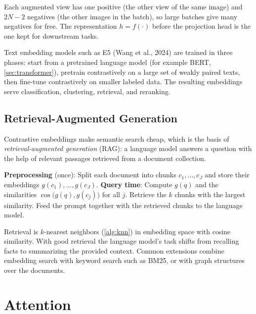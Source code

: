 Each augmented view has one positive (the other view of the same image) and $2N-2$ negatives (the other images in the batch), so large batches give many negatives for free. The representation $h=f(\cdot)$ before the projection head is the one kept for downstream tasks.

Text embedding models such as E5 (Wang et al., 2024) are trained in three phases: start from a pretrained language model (for example BERT, \cref{sec:transformer}), pretrain contrastively on a large set of weakly paired texts, then fine-tune contrastively on smaller labeled data. The resulting embeddings serve classification, clustering, retrieval, and reranking.

\subsection{Retrieval-Augmented Generation}

Contrastive embeddings make semantic search cheap, which is the basis of \emph{retrieval-augmented generation} (RAG): a language model answers a question with the help of relevant passages retrieved from a document collection.

\begin{algorithm}[H]
\caption{Retrieval-Augmented Generation}\label{alg:rag}
\begin{algorithmic}[1]
\Statex \textbf{Preprocessing} (once):
\State Split each document into chunks $c_1,\dots,c_J$ and store their embeddings $g(c_1),\dots,g(c_J)$.
\Statex \textbf{Query time}:
\State Compute $g(q)$ and the similarities $\cos\big(g(q),g(c_j)\big)$ for all $j$.
\State Retrieve the $k$ chunks with the largest similarity.
\State Feed the prompt together with the retrieved chunks to the language model.
\end{algorithmic}
\end{algorithm}

Retrieval is $k$-nearest neighbors (\cref{alg:knn}) in embedding space with cosine similarity. With good retrieval the language model's task shifts from recalling facts to summarizing the provided context. Common extensions combine embedding search with keyword search such as BM25, or with graph structures over the documents.

\section{Attention}\label{sec:attention}

